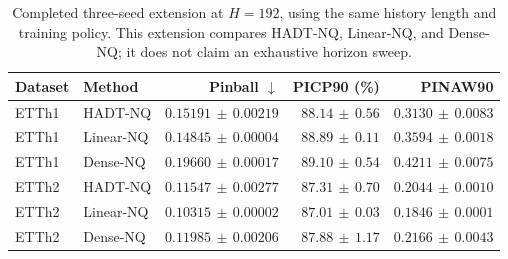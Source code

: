 \begin{table}[t]
\caption{Completed three-seed extension at $H=192$, using the same history length and training policy. This extension compares HADT-NQ, Linear-NQ, and Dense-NQ; it does not claim an exhaustive horizon sweep.}
\label{tab:horizon}
\centering
\small
\begin{tabular}{@{}llrrr@{}}
\toprule
Dataset & Method & Pinball $\downarrow$ & PICP90 (\%) & PINAW90 \\
\midrule
ETTh1 & HADT-NQ & $0.15191\,\pm\,0.00219$ & $88.14\,\pm\,0.56$ & $0.3130\,\pm\,0.0083$ \\
ETTh1 & Linear-NQ & $0.14845\,\pm\,0.00004$ & $88.89\,\pm\,0.11$ & $0.3594\,\pm\,0.0018$ \\
ETTh1 & Dense-NQ & $0.19660\,\pm\,0.00017$ & $89.10\,\pm\,0.54$ & $0.4211\,\pm\,0.0075$ \\
ETTh2 & HADT-NQ & $0.11547\,\pm\,0.00277$ & $87.31\,\pm\,0.70$ & $0.2044\,\pm\,0.0010$ \\
ETTh2 & Linear-NQ & $0.10315\,\pm\,0.00002$ & $87.01\,\pm\,0.03$ & $0.1846\,\pm\,0.0001$ \\
ETTh2 & Dense-NQ & $0.11985\,\pm\,0.00206$ & $87.88\,\pm\,1.17$ & $0.2166\,\pm\,0.0043$ \\
\bottomrule
\end{tabular}
\end{table}
